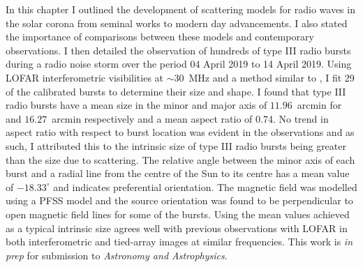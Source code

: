 In this chapter I outlined the development of scattering models for radio waves in the solar corona from seminal works to modern day advancements. I also stated the importance of comparisons between these models and contemporary observations. I then detailed the observation of hundreds of type III radio bursts during a radio noise storm over the period 04 April 2019 to 14 April 2019. Using LOFAR interferometric visibilities at $\sim 30$~MHz and a method similar to \cite{Murphy2021}, I fit 29 of the calibrated bursts to determine their size and shape. I found that type III radio bursts have a mean size in the minor and major axis of $11.96$~arcmin for and $16.27$~arcmin respectively and a mean aspect ratio of 0.74. No trend in aspect ratio with respect to burst location was evident in the observations and as such, I attributed this to the intrinsic size of type III radio bursts being greater than the size due to scattering. The relative angle between the minor axis of each burst and a radial line from the centre of the Sun to its centre has a mean value of $-18.33^\circ$ and indicates preferential orientation. The magnetic field was modelled using a PFSS model and the source orientation was found to be perpendicular to open magnetic field lines for some of the bursts. Using the mean values achieved as a typical intrinsic size agrees well with previous observations with LOFAR in both interferometric and tied-array images at similar frequencies. This work is \textit{in prep} for submission to \textit{Astronomy and Astrophysics}.
